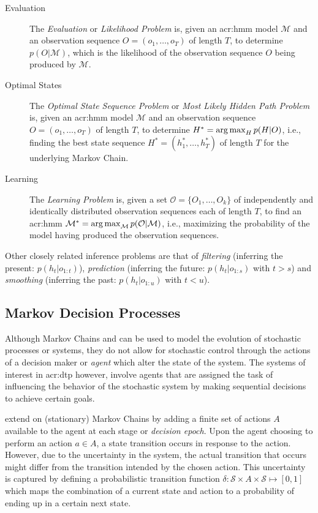 \begin{description}
	\item[Evaluation] The \textit{Evaluation} or \textit{Likelihood Problem} is, given an \acrshort{acr:hmm} model $\mathcal{M}$ and an observation sequence $O = (o_1,\ldots,o_T)$ of length $T$, to determine $p(O\vert \mathcal{M})$, which is the likelihood of the observation sequence $O$ being produced by $\mathcal{M}$.
	\item[Optimal States] The \textit{Optimal State Sequence Problem} or \textit{Most Likely Hidden Path Problem} is, given an \acrshort{acr:hmm} model $\mathcal{M}$ and an observation sequence $O = (o_1,\ldots,o_T)$ of length $T$, to determine $H^\ast = \operatorname*{arg\,max}_H p(H \vert O)$, i.e., finding the best state sequence $H^\ast = (h_1^\ast, \ldots, h_T^\ast)$ of length $T$ for the underlying Markov Chain.
	\item[Learning] The \textit{Learning Problem} is, given a set $\mathcal{O} = \{O_1, \ldots, O_k\}$ of independently and identically distributed observation sequences each of length $T$, to find an \acrshort{acr:hmm} $\mathcal{M}^\ast = \operatorname*{arg\,max}_\mathcal{M} p(\mathcal{O}\vert \mathcal{M})$, i.e., maximizing the probability of the model having produced the observation sequences.
\end{description}
Other closely related inference problems are that of \textit{filtering} (inferring the present: $p(h_t\vert o_{1:t})$), \textit{prediction} (inferring the future: $p(h_t \vert o_{1:s})$ with $t > s$) and \textit{smoothing} (inferring the past: $p(h_t \vert o_{1:u})$ with $t < u$).

\subsection{Markov Decision Processes}
\label{subsec:mdps}


Although Markov Chains and  can be used to model the evolution of stochastic processes or systems, they do not allow for stochastic control through the actions of a decision maker or \textit{agent} which alter the state of the system.
The systems of interest in \acrshort{acr:dtp} however, involve agents that are assigned the task of influencing the behavior of the stochastic system by making sequential decisions to achieve certain goals.

 extend on (stationary) Markov Chains by adding a finite set of actions $A$ available to the agent at each stage or \textit{decision epoch}.
Upon the agent choosing to perform an action $a \in A$, a state transition occurs in response to the action.
However, due to the uncertainty in the system, the actual transition that occurs might differ from the transition intended by the chosen action.
This uncertainty is captured by defining a probabilistic transition function $\delta: \mathcal{S} \times A \times \mathcal{S} \mapsto [0,1]$ which maps the combination of a current state and action to a probability of ending up in a certain next state.

